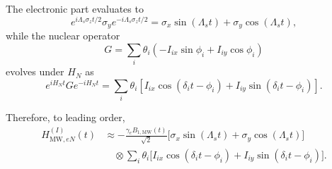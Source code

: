 \documentclass[
  aps,
  pra,
  reprint,            %
  superscriptaddress, %
  amsmath,amssymb,
  notitlepage
]{revtex4-2}
\begin{document}
The electronic part evaluates to
\[
e^{i\Lambda_s\sigma_z t/2}
\sigma_y
e^{-i\Lambda_s\sigma_z t/2}
=
\sigma_x\sin(\Lambda_s t)
+
\sigma_y\cos(\Lambda_s t),
\]
while the nuclear operator
\[
G
=
\sum_i\theta_i
\left(
-I_{ix}\sin\phi_i
+
I_{iy}\cos\phi_i
\right)
\]
evolves under \(H_N\) as
\[
e^{iH_N t}
G
e^{-iH_N t}
=
\sum_i\theta_i
\left[
I_{ix}\cos(\delta_i t-\phi_i)
+
I_{iy}\sin(\delta_i t-\phi_i)
\right].
\]

Therefore, to leading order,
\begin{equation}
\begin{aligned}
H_{\mathrm{MW},eN}^{(I)}(t)
&\approx
-\frac{\gamma_e B_{1,\mathrm{MW}}(t)}{\sqrt2}
\big[
\sigma_x\sin(\Lambda_s t)
+
\sigma_y\cos(\Lambda_s t)
\big]
\\
&\quad\otimes
\sum_i\theta_i
\big[
I_{ix}\cos(\delta_i t-\phi_i)
+
I_{iy}\sin(\delta_i t-\phi_i)
\big].
\end{aligned}
\label{eq:HeN_I}
\end{equation}
\end{document}
